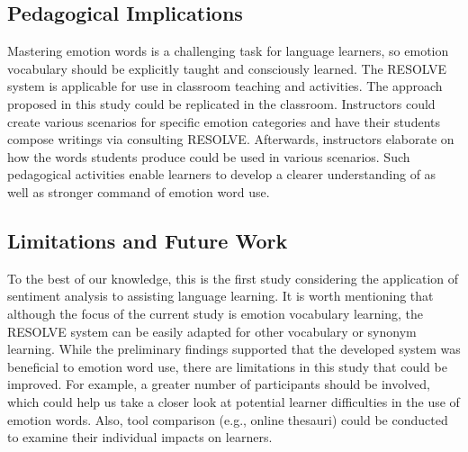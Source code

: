 \documentclass[a4paper,12pt,oneside]{article}
\begin{document}
\subsection{Pedagogical Implications}
Mastering emotion words is a challenging task for language learners, so emotion vocabulary should be explicitly taught and consciously learned. The RESOLVE system is applicable for use in classroom teaching and activities. The approach proposed in this study could be replicated in the classroom. Instructors could create various scenarios for specific emotion categories and have their students compose writings via consulting RESOLVE. Afterwards, instructors elaborate on how the words students produce could be used in various scenarios. Such pedagogical activities enable learners to develop a clearer understanding of as well as stronger command of emotion word use. 
\subsection{Limitations and Future Work}
To the best of our knowledge, this is the first study considering the application of sentiment analysis to assisting language learning. It is worth mentioning that although the focus of the current study is emotion vocabulary learning, the RESOLVE system can be easily adapted for other vocabulary or synonym learning. While the preliminary findings supported that the developed system was beneficial to emotion word use, there are limitations in this study that could be improved. For example, a greater number of participants should be involved, which could help us take a closer look at potential learner difficulties in the use of emotion words. Also, tool comparison (e.g., online thesauri) could be conducted to examine their individual impacts on learners. 
\end{document}
